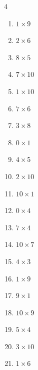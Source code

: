 \begin{multicols}{4}
\begin{enumerate}
  \item $1\times 9$
        \phantom{$=9$}

  \item $2\times 6$
        \phantom{$=12$}

  \item $8\times 5$
        \phantom{$=40$}

\columnbreak %

  \item $7\times 10$
        \phantom{$=70$}

  \item $1\times 10$
        \phantom{$=10$}

  \item $7\times 6$
        \phantom{$=42$}

  \item $3\times 8$
        \phantom{$=24$}

  \item $0\times 1$
        \phantom{$=0$}

  \item $4\times 5$
        \phantom{$=20$}

  \item $2\times 10$
        \phantom{$=20$}

  \item $10\times 1$
        \phantom{$=10$}

  \item $0\times 4$
        \phantom{$=0$}

  \item $7\times 4$
        \phantom{$=28$}

  \item $10\times 7$
        \phantom{$=70$}

  \item $4\times 3$
        \phantom{$=12$}

  \item $1\times 9$
        \phantom{$=9$}

  \item $9\times 1$
        \phantom{$=9$}

  \item $10\times 9$
        \phantom{$=90$}

  \item $5\times 4$
        \phantom{$=20$}

  \item $3\times 10$
        \phantom{$=30$}

  \item $1\times 6$
        \phantom{$=6$}


\end{enumerate}
\end{multicols}
